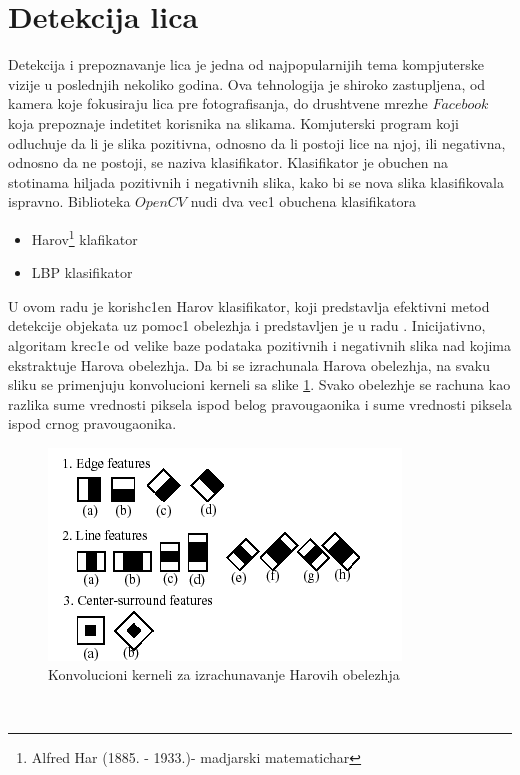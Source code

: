 \documentclass[a4paper, openany, oneside, 11pt]{book}
\begin{document}
\section{Detekcija lica}\label{detekcijalica}
Detekcija i prepoznavanje lica je jedna od najpopularnijih tema kompjuterske vizije u poslednjih nekoliko godina. Ova tehnologija je shiroko zastupljena, od kamera koje fokusiraju lica pre fotografisanja, do drushtvene mrezhe $Facebook$ koja prepoznaje  indetitet korisnika na slikama. Komjuterski program koji odlu\-chuje da li je slika pozitivna, odnosno da li postoji lice na njoj, ili negativna, odnosno da ne postoji, se naziva klasifikator. Klasifikator je obuchen na stotinama hiljada pozitivnih i negativnih slika, kako bi se nova slika klasifikovala ispravno. Biblioteka $OpenCV$ \cite{Opencv} nudi dva vec1 obuchena klasifikatora
\begin{itemize}
\item Harov\footnote{Alfred Har (1885. - 1933.)- madjarski matematichar } klafikator
\item \acrshort{LBP} klasifikator
\end{itemize}
U ovom radu je korish\-c1en Harov klasifikator, koji predstavlja efektivni metod detekcije objekata uz pomoc1 obelezhja i predstavljen je u radu \cite{Haar}. Inicijativno, algoritam krec1e od velike baze podataka pozitivnih i negativnih slika nad kojima ekstraktuje Harova obelezhja. Da bi se izrachunala Harova obelezhja, na svaku sliku se primenjuju konvolucioni kerneli sa slike \ref{fig:2_1}. Svako obelezhje se rachuna kao razlika sume vrednosti piksela ispod belog pravougaonika i sume vrednosti piksela ispod crnog pravougaonika.
\begin{figure}[h!]
\centering
  \includegraphics[scale=0.5]{res/haar_kernels.png}
  \caption{Konvolucioni kerneli za izrachunavanje Harovih obelezhja}
  \label{fig:2_1}
  \vspace{0pt}
\end{figure}\\
\end{document}
